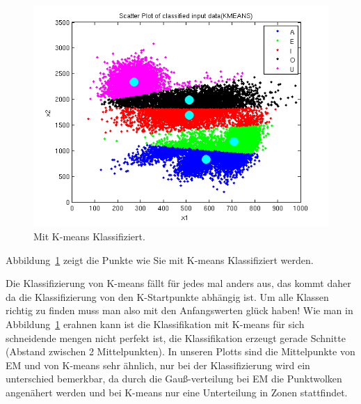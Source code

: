 \begin{figure}[h!]
  \begin{center}
    \includegraphics[width=1\textwidth]{./figures/6_2_classified}
    \caption{Mit K-means Klassifiziert.}
    \label{fig:6_2_classified}
  \end{center}
\end{figure}

Abbildung~\ref{fig:6_2_classified} zeigt die Punkte wie Sie mit K-means Klassifiziert werden.\newline
 


Die Klassifizierung von K-means fällt für jedes mal anders aus, das kommt daher da die Klassifizierung von den K-Startpunkte abhängig ist. Um alle Klassen richtig zu finden muss man also mit den Anfangswerten glück haben! Wie man in Abbildung~\ref{fig:6_2_classified} erahnen kann ist die Klassifikation mit K-means für sich schneidende mengen nicht perfekt ist, die Klassifikation erzeugt gerade Schnitte (Abstand zwischen 2 Mittelpunkten).
In unseren Plotts sind die Mittelpunkte von  EM und von K-means sehr ähnlich, nur bei der Klassifizierung wird ein unterschied bemerkbar, da durch die Gauß-verteilung bei EM die Punktwolken angenähert werden und bei K-means nur eine Unterteilung in Zonen stattfindet.
